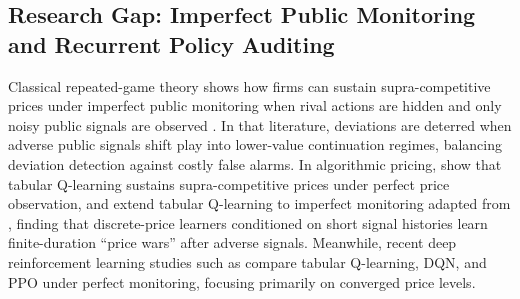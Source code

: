\subsection{Research Gap: Imperfect Public Monitoring and Recurrent Policy Auditing}

Classical repeated-game theory shows how firms can sustain supra-competitive prices under imperfect public monitoring when rival actions are hidden and only noisy public signals are observed \citep{green1984noncooperative, abreu1990toward, fudenberg1994folk}. In that literature, deviations are deterred when adverse public signals shift play into lower-value continuation regimes, balancing deviation detection against costly false alarms. In algorithmic pricing, \citet{calvano2020artificial} show that tabular Q-learning sustains supra-competitive prices under perfect price observation, and \citet{calvano2021algorithmic} extend tabular Q-learning to imperfect monitoring adapted from \citet{green1984noncooperative}, finding that discrete-price learners conditioned on short signal histories learn finite-duration ``price wars'' after adverse signals. Meanwhile, recent deep reinforcement learning studies such as \citet{deng2025exploring} compare tabular Q-learning, DQN, and PPO under perfect monitoring, focusing primarily on converged price levels.

